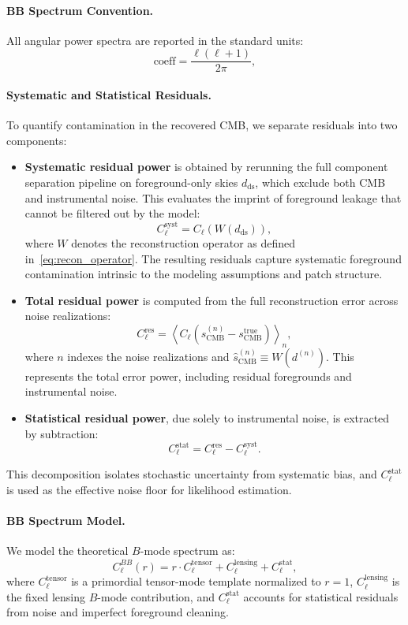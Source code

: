 \documentclass[%
 reprint,
bibnotes,
 amsmath,amssymb,
 aps,
floatfix, 
]{revtex4-2}
\begin{document}
\paragraph{BB Spectrum Convention.}
All angular power spectra are reported in the standard units:
\[
\text{coeff} = \frac{\ell(\ell + 1)}{2\pi},
\]

\paragraph{Systematic and Statistical Residuals.}
To quantify contamination in the recovered CMB, we separate residuals into two components:
\begin{itemize}

    \item \textbf{Systematic residual power} is obtained by rerunning the full component separation pipeline on foreground-only skies \( d_{\mathrm{ds}} \), which exclude both CMB and instrumental noise. This evaluates the imprint of foreground leakage that cannot be filtered out by the model:
    \[
    C_\ell^{\mathrm{syst}} = C_\ell \left( W(d_{\mathrm{ds}}) \right),
    \]
    where \( W \) denotes the reconstruction operator as defined in~\eqref{eq:recon_operator}. The resulting residuals capture systematic foreground contamination intrinsic to the modeling assumptions and patch structure.

    \item \textbf{Total residual power} is computed from the full reconstruction error across noise realizations:
    \[
    C_\ell^{\mathrm{res}} = \left\langle C_\ell \left( \hat{s}_{\mathrm{CMB}}^{(n)} - s_{\mathrm{CMB}}^{\mathrm{true}} \right) \right\rangle_{n},
    \]
    where \( n \) indexes the noise realizations and \( \hat{s}_{\mathrm{CMB}}^{(n)} \equiv W(d^{(n)}) \).
    This represents the total error power, including residual foregrounds and instrumental noise.

    \item \textbf{Statistical residual power}, due solely to instrumental noise, is extracted by subtraction:
    \[
    C_\ell^{\mathrm{stat}} = C_\ell^{\mathrm{res}} - C_\ell^{\mathrm{syst}}.
    \]
\end{itemize}
This decomposition isolates stochastic uncertainty from systematic bias, and \( C_\ell^{\mathrm{stat}} \) is used as the effective noise floor for likelihood estimation.

\paragraph{BB Spectrum Model.}
We model the theoretical \( B \)-mode spectrum as:
\[
C_\ell^{BB}(r) = r \cdot C_\ell^{\mathrm{tensor}} + C_\ell^{\mathrm{lensing}} + C_\ell^{\mathrm{stat}},
\]
where \( C_\ell^{\mathrm{tensor}} \) is a primordial tensor-mode template normalized to \( r = 1 \), \( C_\ell^{\mathrm{lensing}} \) is the fixed lensing \( B \)-mode contribution, and \( C_\ell^{\mathrm{stat}} \) accounts for statistical residuals from noise and imperfect foreground cleaning.
\end{document}
